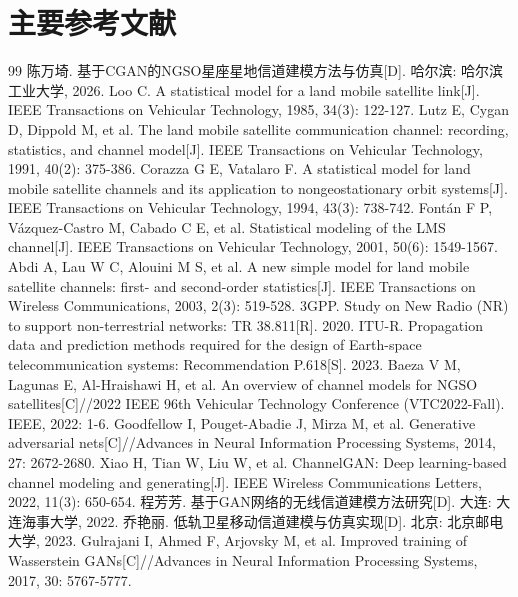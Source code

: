 \documentclass[12pt, a4paper]{ctexart}
\begin{document}
\section{主要参考文献}
\begin{thebibliography}{99}
\sloppy
\setlength{\itemsep}{-0.3ex}
\small
{} 陈万埼. 基于CGAN的NGSO星座星地信道建模方法与仿真[D]. 哈尔滨: 哈尔滨工业大学, 2026.
 Loo C. A statistical model for a land mobile satellite link[J]. IEEE Transactions on Vehicular Technology, 1985, 34(3): 122-127.
 Lutz E, Cygan D, Dippold M, et al. The land mobile satellite communication channel: recording, statistics, and channel model[J]. IEEE Transactions on Vehicular Technology, 1991, 40(2): 375-386.
 Corazza G E, Vatalaro F. A statistical model for land mobile satellite channels and its application to nongeostationary orbit systems[J]. IEEE Transactions on Vehicular Technology, 1994, 43(3): 738-742.
 Fontán F P, Vázquez-Castro M, Cabado C E, et al. Statistical modeling of the LMS channel[J]. IEEE Transactions on Vehicular Technology, 2001, 50(6): 1549-1567.
 Abdi A, Lau W C, Alouini M S, et al. A new simple model for land mobile satellite channels: first- and second-order statistics[J]. IEEE Transactions on Wireless Communications, 2003, 2(3): 519-528.
 3GPP. Study on New Radio (NR) to support non-terrestrial networks: TR 38.811[R]. 2020.
 ITU-R. Propagation data and prediction methods required for the design of Earth-space telecommunication systems: Recommendation P.618[S]. 2023.
 Baeza V M, Lagunas E, Al-Hraishawi H, et al. An overview of channel models for NGSO satellites[C]//2022 IEEE 96th Vehicular Technology Conference (VTC2022-Fall). IEEE, 2022: 1-6.
 Goodfellow I, Pouget-Abadie J, Mirza M, et al. Generative adversarial nets[C]//Advances in Neural Information Processing Systems, 2014, 27: 2672-2680.
 Xiao H, Tian W, Liu W, et al. ChannelGAN: Deep learning-based channel modeling and generating[J]. IEEE Wireless Communications Letters, 2022, 11(3): 650-654.
 程芳芳. 基于GAN网络的无线信道建模方法研究[D]. 大连: 大连海事大学, 2022.
 乔艳丽. 低轨卫星移动信道建模与仿真实现[D]. 北京: 北京邮电大学, 2023.
 Gulrajani I, Ahmed F, Arjovsky M, et al. Improved training of Wasserstein GANs[C]//Advances in Neural Information Processing Systems, 2017, 30: 5767-5777.

\end{thebibliography}
\end{document}
